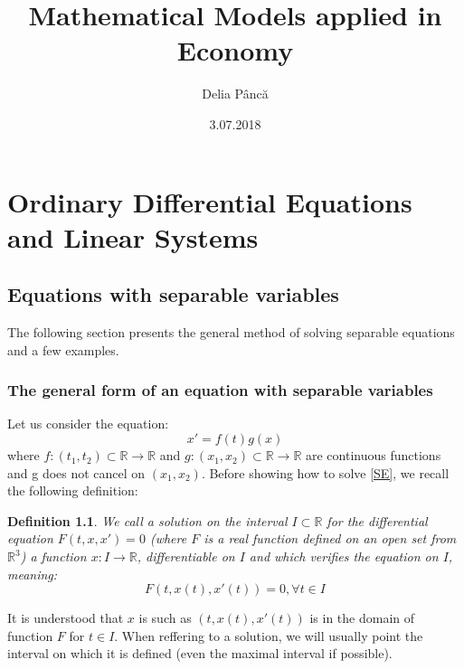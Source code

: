 \documentclass[a4paper,11pt]{report}
\title{Mathematical Models applied in Economy}
\date{3.07.2018}
\author{Delia P\^{a}nc\u{a}}
\newtheorem{definition}{Definition}[subsection]
\newcommand{\R}{\mathbb{R}}
\newcommand\blankpage{%
    \null
    \thispagestyle{empty}%
    \addtocounter{page}{-1}%
    \newpage}
\begin{document}
 \maketitle
 \afterpage{\blankpage}
 

 
 \chapter{Ordinary Differential Equations and Linear Systems}
 \section{Equations with separable variables}\label{1.1.1}
 The following section presents the general method of solving separable equations and a few examples.
 \subsection{The general form of an equation with separable variables}
 Let us consider the equation:
 \begin{equation}
  x'=f(t)g(x) \label{SE} \tag{SE}
 \end{equation}
 where $f:(t_1,t_2)\subset \R \rightarrow \R$ and $g:(x_1,x_2)\subset \R \rightarrow \R$ are continuous functions and g does not cancel on $(x_1,x_2)$.
 Before showing how to solve \eqref{SE}, we recall the following definition:
 
 \begin{definition}
  We call a solution on the interval $I \subset \R$ for the differential equation $F(t,x,x')=0$ (where $F$ is a real function defined on an open set from $\R^3$) a function
 $x:I\rightarrow\R$, differentiable on $I$ and which verifies the equation on $I$, meaning:
  \begin{equation}
   F(t,x(t),x'(t))=0, \forall t\in I \nonumber
  \end{equation}

 \end{definition}
 
It is understood that $x$ is such as $(t,x(t),x'(t))$ is in the domain of function $F$ for $t\in I$.
When reffering to a solution, we will usually point the interval on which it is defined (even the maximal interval if possible).
\newline\newline
\end{document}
